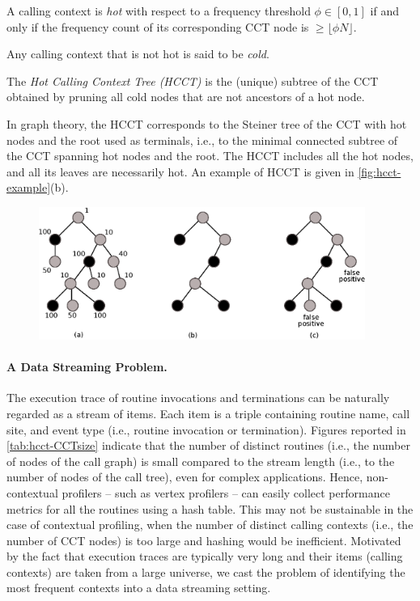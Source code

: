 \begin{definition}
A calling context is {\em hot} with respect to a frequency threshold $\phi\in[0,1]$ if and only if the frequency count of its corresponding CCT node is $\geq \lfloor\phi N\rfloor$. 
\end{definition}

\noindent Any calling context that is not hot is said to be {\em cold}. 

\begin{definition}
The {\em Hot Calling Context Tree (HCCT)} is the (unique) subtree of the CCT obtained by pruning all cold nodes that are not ancestors of a hot node.
\end{definition}

\noindent In graph theory, the HCCT corresponds to the Steiner tree of the CCT with hot nodes and the root used as terminals, i.e., to the minimal connected subtree of the CCT spanning hot nodes and the root. The HCCT includes all the hot nodes, and all its leaves are necessarily hot. An example of HCCT is given in \myfigure\ref{fig:hcct-example}(b). 

\ifdefined\noauthorea
\begin{figure}[ht]
\begin{center}
\includegraphics[width=0.95\textwidth]{figures/hcct-example/hcct-example.eps}
\caption{\protect}
\end{center}
\end{figure}
\fi

\paragraph*{A Data Streaming Problem.} The execution trace of routine invocations and terminations can be naturally regarded as a stream of items. Each item is a triple containing routine name, call site, and event type (i.e., routine invocation or termination). Figures reported in \mytable\ref{tab:hcct-CCTsize} indicate that the number of distinct routines (i.e., the number of nodes of the call graph) is small compared to the stream length (i.e., to the number of nodes of the call tree), even for complex applications. Hence, non-contextual profilers -- such as vertex profilers -- can easily collect performance metrics for all the routines using a hash table. This may not be sustainable in the case of contextual profiling, when the number of distinct calling contexts (i.e., the number of CCT nodes) is too large and hashing would be inefficient. Motivated by the fact that execution traces are typically very long and their items (calling contexts) are taken from a large universe, we cast the problem of identifying the most frequent contexts into a data streaming setting.

